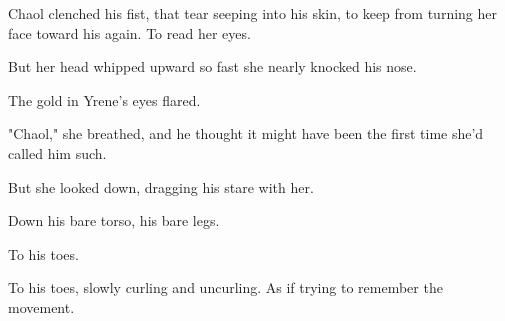 Chaol clenched his fist, that tear seeping into his skin, to keep from turning her face toward his again.
To read her eyes.

But her head whipped upward so fast she nearly knocked his nose.

The gold in Yrene's eyes flared.

"Chaol," she breathed, and he thought it might have been the first time she'd called him such.

But she looked down, dragging his stare with her.

Down his bare torso, his bare legs.

To his toes.

To his toes, slowly curling and uncurling.
As if trying to remember the movement.

